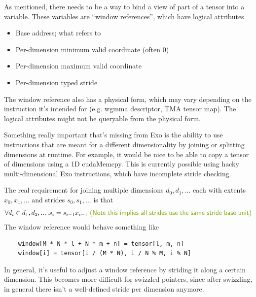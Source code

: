 
As mentioned, there needs to be a way to bind a view of part of a tensor into a variable.
These variables are ``window references'', which have logical attributes
\begin{itemize}
  \item Base address; what  refers to
  \item Per-dimension minimum valid coordinate (often 0)
  \item Per-dimension maximum valid coordinate
  \item Per-dimension typed stride
\end{itemize}
The window reference also has a physical form, which may vary depending on the instruction it's intended for (e.g. wgmma descriptor, TMA tensor map).
The logical attributes might not be queryable from the physical form.


Something really important that's missing from Exo is the ability to use instructions that are meant for a different dimensionality by joining or splitting dimensions at runtime.
For example, it would be nice to be able to copy a tensor of dimensions \lighttt{[L, M, N]} using a 1D cudaMemcpy.
This is currently possible using hacky multi-dimensional Exo instructions, which have incomplete stride checking.

The real requirement for joining multiple dimensions $d_0, d_1, ...$ each with extents $x_0, x_1, ...$ and strides $s_0, s_1, ...$ is that
\begin{equation*}
    \forall d_i \in d_1, d_2, ... \, . s_i = s_{i-1}x_{i-1}  \codecomment{ (Note this implies all strides use the same stride base unit)}
\end{equation*}
The window reference would behave something like
\begin{verbatim}
    window[M * N * l + N * m + n] = tensor[l, m, n]
    window[i] = tensor[i / (M * N), i / N % M, i % N]
\end{verbatim}


In general, it's useful to adjust a window reference by striding it along a certain dimension.
This becomes more difficult for swizzled pointers, since after swizzling, in general there isn't a well-defined stride per dimension anymore.

